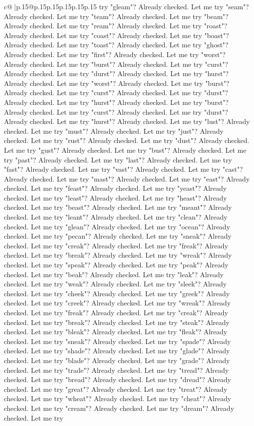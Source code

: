 \documentclass{article}
\begin{document}
{\begin{supertabular}{c@{$\;$}|p{.15\linewidth}@{}p{.15\linewidth}p{.15\linewidth}p{.15\linewidth}p{.15\linewidth}p{.15\linewidth}}
{{{try "gleam"? Already checked. Let me try "seam"? Already checked. Let me try "team"? Already checked. Let me try "beam"? Already checked. Let me try "ream"? Already checked. Let me try "roast"? Already checked. Let me try "coast"? Already checked. Let me try "boast"? Already checked. Let me try "toast"? Already checked. Let me try "ghost"? Already checked. Let me try "first"? Already checked. Let me try "worst"? Already checked. Let me try "burst"? Already checked. Let me try "curst"? Already checked. Let me try "durst"? Already checked. Let me try "hurst"? Already checked. Let me try "worst"? Already checked. Let me try "burst"? Already checked. Let me try "curst"? Already checked. Let me try "durst"? Already checked. Let me try "hurst"? Already checked. Let me try "burst"? Already checked. Let me try "curst"? Already checked. Let me try "durst"? Already checked. Let me try "hurst"? Already checked. Let me try "lust"? Already checked. Let me try "must"? Already checked. Let me try "just"? Already checked. Let me try "rust"? Already checked. Let me try "dust"? Already checked. Let me try "gust"? Already checked. Let me try "bust"? Already checked. Let me try "past"? Already checked. Let me try "last"? Already checked. Let me try "fast"? Already checked. Let me try "vast"? Already checked. Let me try "cast"? Already checked. Let me try "mast"? Already checked. Let me try "east"? Already checked. Let me try "feast"? Already checked. Let me try "yeast"? Already checked. Let me try "least"? Already checked. Let me try "heast"? Already checked. Let me try "beast"? Already checked. Let me try "meant"? Already checked. Let me try "leant"? Already checked. Let me try "clean"? Already checked. Let me try "glean"? Already checked. Let me try "ocean"? Already checked. Let me try "pecan"? Already checked. Let me try "sneak"? Already checked. Let me try "creak"? Already checked. Let me try "freak"? Already checked. Let me try "break"? Already checked. Let me try "wreak"? Already checked. Let me try "speak"? Already checked. Let me try "peak"? Already checked. Let me try "beak"? Already checked. Let me try "leak"? Already checked. Let me try "weak"? Already checked. Let me try "sleek"? Already checked. Let me try "cheek"? Already checked. Let me try "greek"? Already checked. Let me try "creek"? Already checked. Let me try "wreak"? Already checked. Let me try "freak"? Already checked. Let me try "creak"? Already checked. Let me try "break"? Already checked. Let me try "steak"? Already checked. Let me try "bleak"? Already checked. Let me try "fleak"? Already checked. Let me try "sneak"? Already checked. Let me try "spade"? Already checked. Let me try "shade"? Already checked. Let me try "glade"? Already checked. Let me try "blade"? Already checked. Let me try "grade"? Already checked. Let me try "trade"? Already checked. Let me try "tread"? Already checked. Let me try "bread"? Already checked. Let me try "dread"? Already checked. Let me try "great"? Already checked. Let me try "treat"? Already checked. Let me try "wheat"? Already checked. Let me try "cheat"? Already checked. Let me try "cream"? Already checked. Let me try "dream"? Already checked. Let me try }}}
\end{supertabular}}
\end{document}
